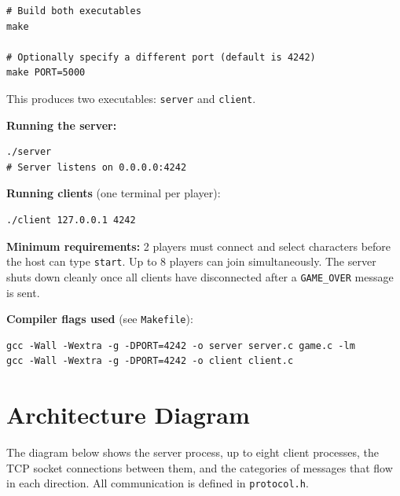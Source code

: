 \documentclass[11pt,letterpaper]{article}
\begin{document}
\begin{lstlisting}
# Build both executables
make

# Optionally specify a different port (default is 4242)
make PORT=5000
\end{lstlisting}

This produces two executables: \texttt{server} and \texttt{client}.

\textbf{Running the server:}
\begin{lstlisting}
./server
# Server listens on 0.0.0.0:4242
\end{lstlisting}

\textbf{Running clients} (one terminal per player):
\begin{lstlisting}
./client 127.0.0.1 4242
\end{lstlisting}

\textbf{Minimum requirements:} 2 players must connect and select characters before the host can type \texttt{start}. Up to 8 players can join simultaneously. The server shuts down cleanly once all clients have disconnected after a \texttt{GAME\_OVER} message is sent.

\textbf{Compiler flags used} (see \texttt{Makefile}):
\begin{lstlisting}
gcc -Wall -Wextra -g -DPORT=4242 -o server server.c game.c -lm
gcc -Wall -Wextra -g -DPORT=4242 -o client client.c
\end{lstlisting}

\section{Architecture Diagram}

The diagram below shows the server process, up to eight client processes, the TCP socket connections between them, and the categories of messages that flow in each direction. All communication is defined in \texttt{protocol.h}.
\end{document}

